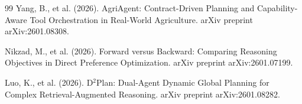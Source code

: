 \documentclass{article}
\begin{document}
\begin{thebibliography}{99}
Yang, B., et al. (2026). AgriAgent: Contract-Driven Planning and Capability-Aware Tool Orchestration in Real-World Agriculture. arXiv preprint arXiv:2601.08308.

Nikzad, M., et al. (2026). Forward versus Backward: Comparing Reasoning Objectives in Direct Preference Optimization. arXiv preprint arXiv:2601.07199.

Luo, K., et al. (2026). D$^2$Plan: Dual-Agent Dynamic Global Planning for Complex Retrieval-Augmented Reasoning. arXiv preprint arXiv:2601.08282.

\end{thebibliography}
\end{document}
